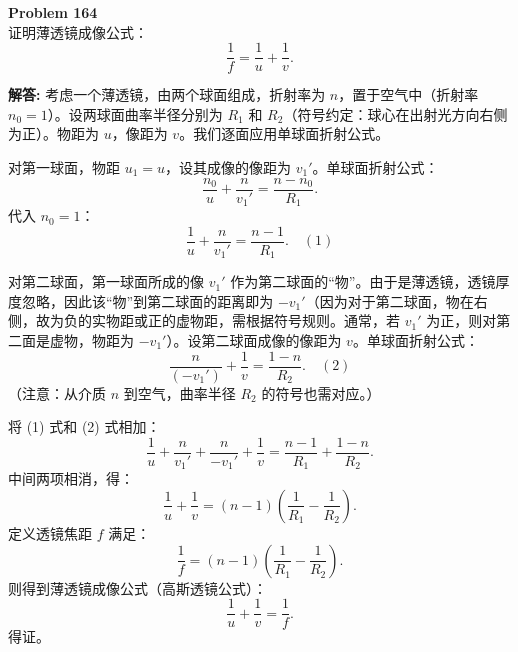 \documentclass[12pt, a4paper, oneside]{ctexart}
\newenvironment{solution}{\par\noindent\textbf{解答:}\quad}{\par}
\begin{document}
\begin{mdframed}[backgroundcolor=gray!10, linewidth=0pt]
    \textbf{Problem 164} \\
    证明薄透镜成像公式：
    \[
    \frac{1}{f} = \frac{1}{u} + \frac{1}{v}.
    \]
\end{mdframed}
\begin{solution}
    考虑一个薄透镜，由两个球面组成，折射率为 $n$，置于空气中（折射率 $n_0=1$）。设两球面曲率半径分别为 $R_1$ 和 $R_2$（符号约定：球心在出射光方向右侧为正）。物距为 $u$，像距为 $v$。我们逐面应用单球面折射公式。

    对第一球面，物距 $u_1 = u$，设其成像的像距为 $v_1'$。单球面折射公式：
    \[
    \frac{n_0}{u} + \frac{n}{v_1'} = \frac{n - n_0}{R_1}.
    \]
    代入 $n_0=1$：
    \[
    \frac{1}{u} + \frac{n}{v_1'} = \frac{n-1}{R_1}. \quad (1)
    \]

    对第二球面，第一球面所成的像 $v_1'$ 作为第二球面的“物”。由于是薄透镜，透镜厚度忽略，因此该“物”到第二球面的距离即为 $-v_1'$（因为对于第二球面，物在右侧，故为负的实物距或正的虚物距，需根据符号规则。通常，若 $v_1'$ 为正，则对第二面是虚物，物距为 $-v_1'$）。设第二球面成像的像距为 $v$。单球面折射公式：
    \[
    \frac{n}{(-v_1')} + \frac{1}{v} = \frac{1 - n}{R_2}. \quad (2)
    \]
    （注意：从介质 $n$ 到空气，曲率半径 $R_2$ 的符号也需对应。）

    将 (1) 式和 (2) 式相加：
    \[
    \frac{1}{u} + \frac{n}{v_1'} + \frac{n}{-v_1'} + \frac{1}{v} = \frac{n-1}{R_1} + \frac{1-n}{R_2}.
    \]
    中间两项相消，得：
    \[
    \frac{1}{u} + \frac{1}{v} = (n-1)\left( \frac{1}{R_1} - \frac{1}{R_2} \right).
    \]
    定义透镜焦距 $f$ 满足：
    \[
    \frac{1}{f} = (n-1)\left( \frac{1}{R_1} - \frac{1}{R_2} \right).
    \]
    则得到薄透镜成像公式（高斯透镜公式）：
    \[
    \frac{1}{u} + \frac{1}{v} = \frac{1}{f}.
    \]
    得证。
\end{solution}
\end{document}
